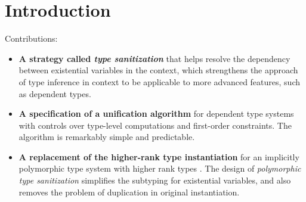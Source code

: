 \section{Introduction}

Contributions:

\begin{itemize}
\item \textbf{A strategy called \textit{type sanitization}} that helps resolve
  the dependency between existential variables in the context, which strengthens
  the approach of type inference in context to be applicable to more advanced
  features, such as dependent types.
\item \textbf{A specification of a unification algorithm} for dependent type
  systems with controls over type-level computations and first-order
  constraints. The algorithm is remarkably simple and predictable.
\item \textbf{A replacement of the higher-rank type instantiation} for an
  implicitly polymorphic type system with higher rank types
  \citep{dunfield2013complete} . The design of \textit{polymorphic type
    sanitization} simplifies the subtyping for existential variables, and also
  removes the problem of duplication in original instantiation.
\end{itemize}

